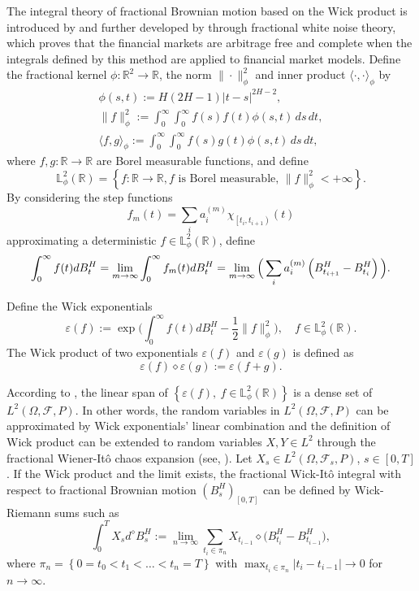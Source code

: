 \documentclass[reqno]{amsart}
\begin{document}
The integral theory of fractional Brownian motion based on the Wick product is 
introduced by \cite{duncan2000stochastic} and further developed by 
\cite{hu2003fractional} through fractional white noise theory, which proves that 
the financial markets are arbitrage free and complete when the integrals defined by 
this method are applied to financial market models. Define the fractional kernel 
$\phi: \mathbb{R}^2 \to \mathbb{R}$, the norm $\|\cdot\|_\phi^2$ and inner
product $\langle\cdot, \cdot\rangle_\phi$ by
\begin{gather*}
\phi(s, t):=H(2 H-1)|t-s|^{2 H-2} ,\\
\|f\|_\phi^2  :=\int_0^{\infty} \int_0^{\infty} f(s) f(t) \phi(s, t) \,ds\,dt, \\
\langle f, g\rangle_\phi  :=\int_0^{\infty} \int_0^{\infty} f(s) g(t) \phi(s, t) \,ds\,dt,
\end{gather*}
where
$f, g:\mathbb{R} \to \mathbb{R}$ are Borel measurable functions, and define
\[
 \mathbb{L}_\phi^2\left(\mathbb{R}\right)=\left\{f:\mathbb{R} \to \mathbb{R},
 f  \text{ is Borel measurable, } \|f\|_\phi^2<+\infty\right\}.
\]
By considering the step functions
\[
 f_m(t)=\sum_i a_i^{(m)} \chi_{\left[t_i, t_{i+1}\right)}\left(t\right)
\]
approximating a deterministic $f \in \mathbb{L}_\phi^2\left(\mathbb{R}\right)$, define
\[
 \int_{0}^{\infty} f(t) d B_t^H
 =\lim _{m \to \infty} \int_{0}^{\infty}f_m(t) d B_t^H \\
 =\lim _{m \to \infty}\Big(\sum_i a_i^{(m)}\left(B_{t_{i+1}}^H-B_{t_i}^H\right)\Big).
\]

Define the Wick exponentials
\[
 \varepsilon(f):=\exp \Big(\int_0^{\infty} f(t) d B^H_t-\frac{1}{2}\|f\|_\phi^2\Big),
\quad f \in \mathbb{L}_\phi^2\left(\mathbb{R}\right).
\]
The Wick product of two exponentials $\varepsilon(f)$ and $\varepsilon(g)$ 
is defined as
\[
 \varepsilon(f) \diamond \varepsilon(g):=\varepsilon(f+g).
\]

According to \cite[Theorem 3.1]{duncan2000stochastic}, the linear span of 
$\left\{\varepsilon(f), \ f \in \mathbb{L}_\phi^2\left(\mathbb{R}\right)\right\}$ 
is a dense set of $L^2\left( \Omega,\mathcal{F} ,P \right)$. 
In other words, the random variables in $L^2\left( \Omega,\mathcal{F} ,P \right)$ 
can be approximated by Wick exponentials' linear combination and the definition 
of Wick product can be extended to random variables $X, Y \in L^2$ through the 
fractional Wiener-It\^o chaos expansion (see, \cite{hu2003fractional}). 
Let $X_s \in L^2\left( \Omega,\mathcal{F}_s ,P \right)$, $s \in \left[0,T\right]$. 
If the Wick product and the limit exists, the fractional Wick-It\^o integral with 
respect to fractional Brownian motion $\left(B_s^H\right)_{[0, T]}$ can be defined 
by Wick-Riemann sums such as
\[
 \int_0^T X_s d^{\diamond} B_s^H:=\lim _{n \to \infty} 
 \sum_{t_i \in \pi_n} X_{t_{i-1}} \diamond\big(B_{t_i}^H-B_{t_{i-1}}^H\big),
\]
where $\pi_n=\left\{0=t_0<t_1<\dots<t_n=T\right\}$ with
$\max _{t_i \in \pi_n}\left|t_i-t_{i-1}\right| \to 0$ for $n \to \infty$.
\end{document}
